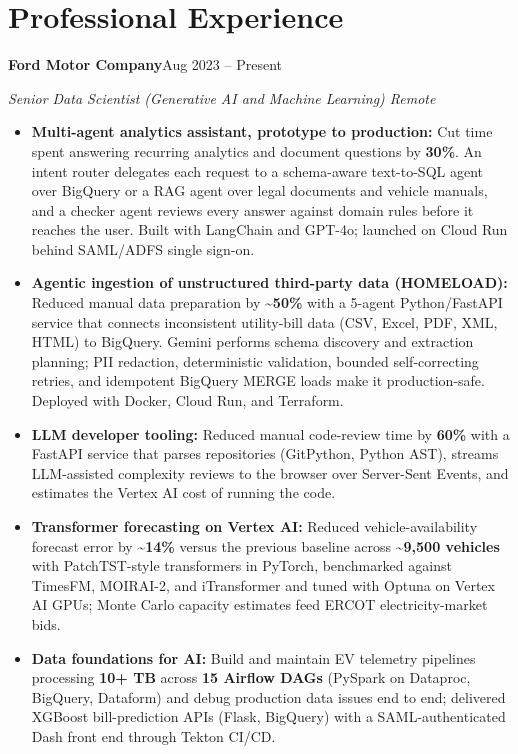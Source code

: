 \documentclass[letterpaper,10pt]{article}
\newcommand{\role}[3]{\par\addvspace{3pt}\needspace{5\baselineskip}\textbf{#1}\hfill #3\par{\itshape #2}\par}
\begin{document}
\section{Professional Experience}
\role{Ford Motor Company}{Senior Data Scientist (Generative AI and Machine Learning) \textbar{} Remote}{Aug 2023 -- Present}
\begin{itemize}
\item \textbf{Multi-agent analytics assistant, prototype to production:} Cut time spent answering recurring analytics and document questions by \textbf{30\%}. An intent router delegates each request to a schema-aware text-to-SQL agent over BigQuery or a RAG agent over legal documents and vehicle manuals, and a checker agent reviews every answer against domain rules before it reaches the user. Built with LangChain and GPT-4o; launched on Cloud Run behind SAML/ADFS single sign-on.
\item \textbf{Agentic ingestion of unstructured third-party data (HOMELOAD):} Reduced manual data preparation by \textbf{\textasciitilde 50\%} with a 5-agent Python/FastAPI service that connects inconsistent utility-bill data (CSV, Excel, PDF, XML, HTML) to BigQuery. Gemini performs schema discovery and extraction planning; PII redaction, deterministic validation, bounded self-correcting retries, and idempotent BigQuery MERGE loads make it production-safe. Deployed with Docker, Cloud Run, and Terraform.
\item \textbf{LLM developer tooling:} Reduced manual code-review time by \textbf{60\%} with a FastAPI service that parses repositories (GitPython, Python AST), streams LLM-assisted complexity reviews to the browser over Server-Sent Events, and estimates the Vertex AI cost of running the code.
\item \textbf{Transformer forecasting on Vertex AI:} Reduced vehicle-availability forecast error by \textbf{\textasciitilde 14\%} versus the previous baseline across \textbf{\textasciitilde 9,500 vehicles} with PatchTST-style transformers in PyTorch, benchmarked against TimesFM, MOIRAI-2, and iTransformer and tuned with Optuna on Vertex AI GPUs; Monte Carlo capacity estimates feed ERCOT electricity-market bids.
\item \textbf{Data foundations for AI:} Build and maintain EV telemetry pipelines processing \textbf{10+ TB} across \textbf{15 Airflow DAGs} (PySpark on Dataproc, BigQuery, Dataform) and debug production data issues end to end; delivered XGBoost bill-prediction APIs (Flask, BigQuery) with a SAML-authenticated Dash front end through Tekton CI/CD.
\end{itemize}
\end{document}
